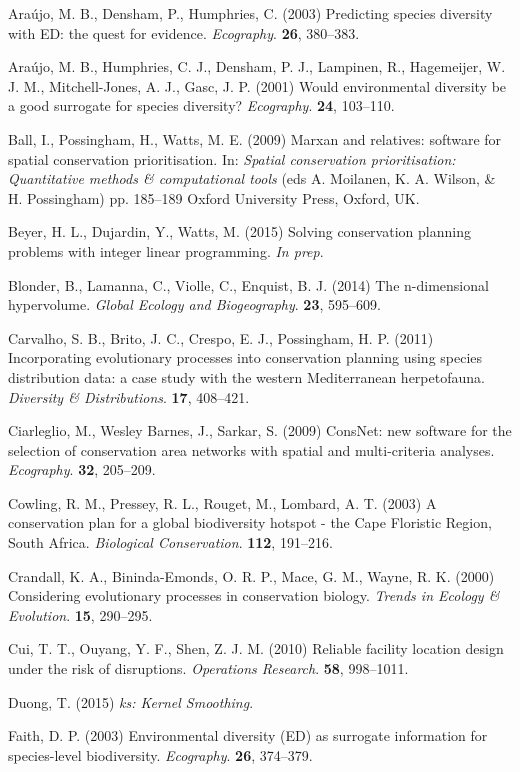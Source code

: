 \documentclass[11pt,]{article}
\begin{document}
{{Araújo}}, M. B., Densham, P., Humphries, C. (2003) Predicting species
diversity with ED: the quest for evidence. \emph{Ecography}.
\textbf{26}, 380--383.

{{Araújo}}, M. B., Humphries, C. J., Densham, P. J., Lampinen, R.,
Hagemeijer, W. J. M., Mitchell-Jones, A. J., Gasc, J. P. (2001) Would
environmental diversity be a good surrogate for species diversity?
\emph{Ecography}. \textbf{24}, 103--110.

Ball, I., Possingham, H., Watts, M. E. (2009) Marxan and relatives:
software for spatial conservation prioritisation. In: \emph{Spatial
conservation prioritisation: Quantitative methods \& computational
tools} (eds A. Moilanen, K. A. Wilson, \& H. Possingham) pp. 185--189
Oxford University Press, Oxford, UK.

Beyer, H. L., Dujardin, Y., Watts, M. (2015) Solving conservation
planning problems with integer linear programming. \emph{In prep}.

Blonder, B., Lamanna, C., Violle, C., Enquist, B. J. (2014) The
n-dimensional hypervolume. \emph{Global Ecology and Biogeography}.
\textbf{23}, 595--609.

Carvalho, S. B., Brito, J. C., Crespo, E. J., Possingham, H. P. (2011)
Incorporating evolutionary processes into conservation planning using
species distribution data: a case study with the western Mediterranean
herpetofauna. \emph{Diversity \& Distributions}. \textbf{17}, 408--421.

Ciarleglio, M., Wesley Barnes, J., Sarkar, S. (2009) ConsNet: new
software for the selection of conservation area networks with spatial
and multi-criteria analyses. \emph{Ecography}. \textbf{32}, 205--209.

Cowling, R. M., Pressey, R. L., Rouget, M., Lombard, A. T. (2003) A
conservation plan for a global biodiversity hotspot - the Cape Floristic
Region, South Africa. \emph{Biological Conservation}. \textbf{112},
191--216.

Crandall, K. A., Bininda-Emonds, O. R. P., Mace, G. M., Wayne, R. K.
(2000) Considering evolutionary processes in conservation biology.
\emph{Trends in Ecology \& Evolution}. \textbf{15}, 290--295.

Cui, T. T., Ouyang, Y. F., Shen, Z. J. M. (2010) Reliable facility
location design under the risk of disruptions. \emph{Operations
Research}. \textbf{58}, 998--1011.

Duong, T. (2015) \emph{ks: Kernel Smoothing}.

Faith, D. P. (2003) Environmental diversity (ED) as surrogate
information for species-level biodiversity. \emph{Ecography}.
\textbf{26}, 374--379.
\end{document}
